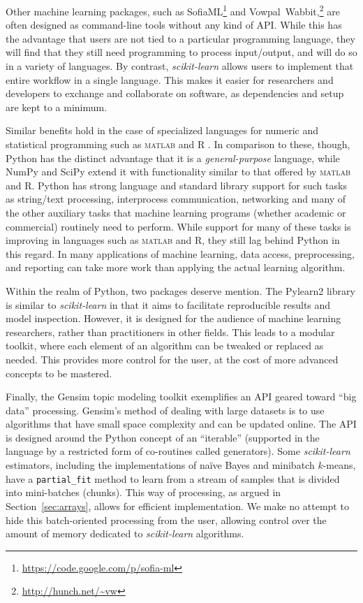 \documentclass[twocolumn]{article}
\newcommand{\sklearn}{\textit{scikit-learn}\xspace}
\begin{document}
Other machine learning packages,
such as SofiaML\footnote{\url{https://code.google.com/p/sofia-ml}}
and Vowpal~Wabbit,\footnote{\url{http://hunch.net/~vw}}
are often designed as command-line tools without any kind of API\@.
While this has the advantage that users are not tied
to a particular programming language,
they will find that they still need programming to process input/output,
and will do so in a variety of languages.
By contrast, \sklearn allows users to implement that entire workflow
in a single language.
This makes it easier for researchers and developers
to exchange and collaborate on software, as dependencies and setup are kept to a
minimum.

Similar benefits hold in the case of specialized languages
for numeric and statistical programming
such as \textsc{matlab} and R \citep{r}.
In comparison to these, though, Python has the distinct advantage
that it is a \textit{general-purpose} language,
while NumPy and SciPy extend it with functionality
similar to that offered by \textsc{matlab} and R.
Python has strong language and standard library support for such tasks as
string/text processing, interprocess communication, networking
and many of the other auxiliary tasks that machine learning programs
(whether academic or commercial) routinely need to perform.
While support for many of these tasks is improving in languages such as
\textsc{matlab} and R, they still lag behind Python in this regard.
In many applications of machine learning, data access,
preprocessing, and reporting can take more work than applying
the actual learning algorithm.

Within the realm of Python, two packages deserve mention.
The Pylearn2 library \citep{goodfellow2013pylearn2}
is similar to \sklearn in that it aims to facilitate reproducible results
and model inspection.
However, it is designed for the audience of machine learning researchers,
rather than practitioners in other fields.
This leads to a modular toolkit,
where each element of an algorithm can be tweaked or replaced as needed.
This provides more control for the user,
at the cost of more advanced concepts to be mastered.

Finally, the Gensim topic modeling toolkit \citep{rehurek2010gensim}
exemplifies an API geared toward ``big data'' processing.
Gensim's method of dealing with large datasets is to use algorithms
that have small space complexity and can be updated online.
The API is designed around the Python concept of an ``iterable''
(supported in the language by a restricted form of co-routines called generators).
Some \sklearn estimators, including the implementations of naïve Bayes
and minibatch $k$-means,
have a \texttt{partial\_fit} method to learn from a stream of samples
that is divided into mini-batches (chunks).
This way of processing, as argued in Section~\ref{sec:arrays},
allows for efficient implementation.
We make no attempt to hide this batch-oriented processing from the user,
allowing control over the amount of memory dedicated to \sklearn algorithms.
\end{document}
